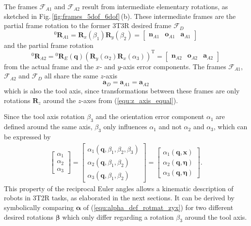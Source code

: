 \documentclass{svproc}
\newcommand{\bm}[1]{\boldsymbol{#1}}
\newcommand{\vek}[3]{\boldsymbol{#1}^{#2}_{#3}}
\newcommand{\rotmat}[2]{{{ }^{#1}\boldsymbol{R}}_{#2}}
\newcommand{\transp}[0]{{\mathrm{T}}}
\newcommand{\ks}[1]{{\mathcal{F}}_{#1}}
\begin{document}
The frames $\ks{A1}$ and $\ks{A2}$ result from intermediate elementary rotations, as sketched in Fig.\,\ref{fig:frames_5dof_6dof}\,(b).
These intermediate frames are the partial frame rotation to the former 3T3R desired frame $\ks{D}$
%
\begin{equation}
\rotmat{0}{A1} 
= 
\bm{R}_x(\beta_1) \bm{R}_y(\beta_2)
=
\begin{bmatrix}
\vek{n}{}{A1} & \vek{o}{}{A1} & \vek{a}{}{A1}
\end{bmatrix}
\end{equation}
%
and the partial frame rotation
%
\begin{equation}
\rotmat{0}{A2} 
= 
\rotmat{0}{E}(\bm{q})
\left(\bm{R}_y(\alpha_2) \bm{R}_x(\alpha_3)\right)^\transp 
=
\begin{bmatrix}
\vek{n}{}{A2} & \vek{o}{}{A2} & \vek{a}{}{A2}
\end{bmatrix}
\end{equation}
%
from the actual frame and the $x$- and $y$-axis error components.
%
The frames $\ks{A1}$, $\ks{A2}$ and $\ks{D}$ all share the same $z$-axis
%
\begin{equation}
\vek{a}{}{D}
=
\vek{a}{}{A1}
=
\vek{a}{}{A2}
\label{equ:z_axis_equal}
\end{equation}
%
which is also the tool axis, since transformations between these frames are only rotations $\bm{R}_z$ around the $z$-axes from (\ref{equ:z_axis_equal}).

Since the tool axis rotation $\beta_3$ and the orientation error component $\alpha_1$ are defined around the same axis, $\beta_3$ only influences $\alpha_1$ and not $\alpha_2$ and $\alpha_3$, which can be expressed by
%
\begin{align}
\begin{bmatrix}
\alpha_1 \\
\alpha_2 \\
\alpha_3
\end{bmatrix}
=
\begin{bmatrix}
\alpha_1(\bm{q},\beta_1,\beta_2,\beta_3) \\
\alpha_2(\bm{q},\beta_1,\beta_2) \\
\alpha_3(\bm{q},\beta_1,\beta_2)
\end{bmatrix}
=
\begin{bmatrix}
\alpha_1(\bm{q},\bm{x}) \\
\alpha_2(\bm{q},\bm{\eta}) \\
\alpha_3(\bm{q},\bm{\eta}) 
\end{bmatrix}
\label{equ:alpha_dep_beta}.
\end{align}
%
This property of the reciprocal Euler angles allows a kinematic description of robots in 3T2R tasks, as elaborated in the next sections.
It can be derived by symbolically comparing $\bm{\alpha}$ of (\ref{equ:alpha_def_rotmat_zyx}) for two different desired rotations $\bm{\beta}$ which only differ regarding a rotation $\beta_3$ around the tool axis.
\end{document}
